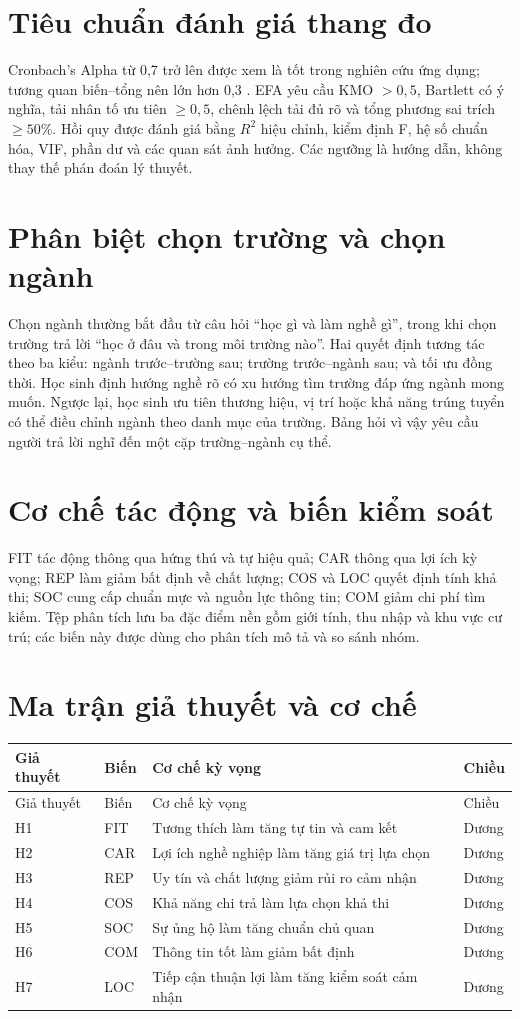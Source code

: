 \section{Tiêu chuẩn đánh giá thang đo}
Cronbach's Alpha từ 0,7 trở lên được xem là tốt trong nghiên cứu ứng dụng; tương quan biến--tổng nên lớn hơn 0,3 \citep{hair2019,nunnally1994}. EFA yêu cầu KMO $>0{,}5$, Bartlett có ý nghĩa, tải nhân tố ưu tiên $\geq0{,}5$, chênh lệch tải đủ rõ và tổng phương sai trích $\geq50\%$. Hồi quy được đánh giá bằng $R^2$ hiệu chỉnh, kiểm định F, hệ số chuẩn hóa, VIF, phần dư và các quan sát ảnh hưởng. Các ngưỡng là hướng dẫn, không thay thế phán đoán lý thuyết.

\section{Phân biệt chọn trường và chọn ngành}
Chọn ngành thường bắt đầu từ câu hỏi ``học gì và làm nghề gì'', trong khi chọn trường trả lời ``học ở đâu và trong môi trường nào''. Hai quyết định tương tác theo ba kiểu: ngành trước--trường sau; trường trước--ngành sau; và tối ưu đồng thời. Học sinh định hướng nghề rõ có xu hướng tìm trường đáp ứng ngành mong muốn. Ngược lại, học sinh ưu tiên thương hiệu, vị trí hoặc khả năng trúng tuyển có thể điều chỉnh ngành theo danh mục của trường. Bảng hỏi vì vậy yêu cầu người trả lời nghĩ đến một cặp trường--ngành cụ thể.

\section{Cơ chế tác động và biến kiểm soát}
FIT tác động thông qua hứng thú và tự hiệu quả; CAR thông qua lợi ích kỳ vọng; REP làm giảm bất định về chất lượng; COS và LOC quyết định tính khả thi; SOC cung cấp chuẩn mực và nguồn lực thông tin; COM giảm chi phí tìm kiếm. Tệp phân tích lưu ba đặc điểm nền gồm giới tính, thu nhập và khu vực cư trú; các biến này được dùng cho phân tích mô tả và so sánh nhóm.

\section{Ma trận giả thuyết và cơ chế}
\begin{longtable}{p{1.2cm}p{2.5cm}p{6.3cm}p{1.7cm}}\toprule Giả thuyết & Biến & Cơ chế kỳ vọng & Chiều\\\midrule\endfirsthead\toprule Giả thuyết & Biến & Cơ chế kỳ vọng & Chiều\\\midrule\endhead H1 & FIT & Tương thích làm tăng tự tin và cam kết & Dương\\H2 & CAR & Lợi ích nghề nghiệp làm tăng giá trị lựa chọn & Dương\\H3 & REP & Uy tín và chất lượng giảm rủi ro cảm nhận & Dương\\H4 & COS & Khả năng chi trả làm lựa chọn khả thi & Dương\\H5 & SOC & Sự ủng hộ làm tăng chuẩn chủ quan & Dương\\H6 & COM & Thông tin tốt làm giảm bất định & Dương\\H7 & LOC & Tiếp cận thuận lợi làm tăng kiểm soát cảm nhận & Dương\\\bottomrule\end{longtable}

